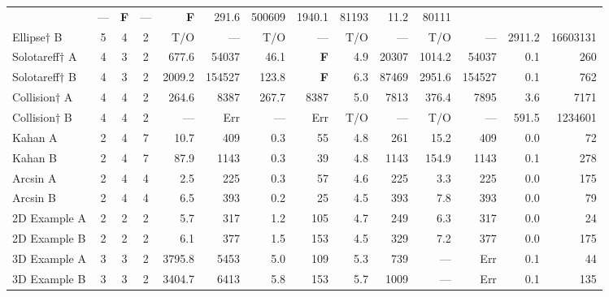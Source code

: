\documentclass{article}
\begin{document}
\begin{sidewaystable*}
\begin{center}
\begin{tabular}{lccc|rr|rr|rr|rr|rr}
						&  ---       &  {\bf F}    &  ---       &  {\bf F}     
						&  291.6     &  500609     &  1940.1    &  81193   
						& 11.2 & 80111 \\
Ellipse$\dagger$ B      & 5 & 4 & 2
						&  T/O       &  ---        &  T/O       &  ---         
						&  T/O       &  ---        &  T/O       &  ---     
						& 2911.2 & 16603131 \\
Solotareff$\dagger$ A   & 4 & 3 & 2
						&  677.6     &  54037      &  46.1      &  {\bf F}    
						&  4.9       &  20307      &  1014.2    &  54037   
						& 0.1 & 260 \\   
Solotareff$\dagger$ B   & 4 & 3 & 2
						&  2009.2    &  154527     &  123.8     &  {\bf F}     
						&  6.3       &  87469      &  2951.6    &  154527  
						& 0.1 & 762 \\
Collision$\dagger$ A    & 4 & 4 & 2
						&  264.6     &  8387       &  267.7     &  8387        
						&  5.0       &  7813       &  376.4     &  7895    
						& 3.6 & 7171 \\ 
Collision$\dagger$ B    & 4 & 4 & 2
						&  ---       &  Err        &  ---         &  Err       
						& T/O        &  ---        &  T/O       &  ---     
						& 591.5 & 1234601 \\
Kahan A                 & 2 & 4 & 7
						&  10.7      &  409        &  0.3       &  55          
						&  4.8       &  261        &  15.2      &  409     
						& 0.0 & 72 \\       
Kahan B                 & 2 & 4 & 7
						&  87.9      &  1143       &  0.3       &  39        
						&  4.8       &  1143       &  154.9     &  1143    
						& 0.1 & 278 \\
Arcsin A                & 2 & 4 & 4
						&  2.5       &  225        &  0.3       &  57          
						&  4.6       &  225        &  3.3       &  225     
						& 0.0 & 175 \\       
Arcsin B                & 2 & 4 & 4
						&  6.5       &  393        &  0.2       &  25          
						&  4.5       &  393        &  7.8       &  393     
						& 0.0 & 79 \\
2D Example A            & 2 & 2 & 2
						&  5.7       &  317        &  1.2       &  105         
						&  4.7       &  249        &  6.3       &  317     
						& 0.0 & 24 \\
2D Example B            & 2 & 2 & 2
						&  6.1       &  377        &  1.5       &  153         
						&  4.5       &  329        &  7.2       &  377     
						& 0.0 & 175 \\
3D Example A            & 3 & 3 & 2
						&  3795.8    &  5453       &  5.0       &  109         
						&  5.3       &  739        &  ---       &  Err     
						& 0.1 & 44 \\
3D Example B            & 3 & 3 & 2
						&  3404.7    &  6413       &  5.8       &  153         
						&  5.7       &  1009       &  ---       &  Err     
						& 0.1 & 135 \\
\end{tabular}
\end{center}
\vskip-20pt
\end{sidewaystable*}
\end{document}
